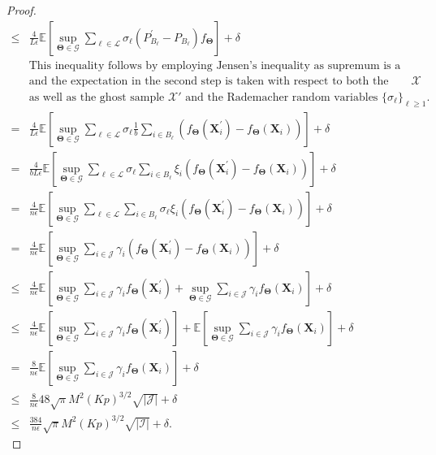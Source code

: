 \documentclass[11pt]{article}
\newcommand{\bX}{\boldsymbol{X}}
\newcommand{\bTheta}{\boldsymbol{\Theta}}
\newcommand{\I}{\mathcal{I}}
\newcommand{\E}{\mathbb{E}}
\newcommand{\J}{\mathcal{J}}
\newcommand{\cL}{\mathcal{L}}
\begin{document}
\begin{proof}
\begin{align}
     \le & \frac{4}{L \epsilon}\E\left[\sup_{\bTheta \in \mathscr{G}}\sum_{\ell \in \cL}\sigma_\ell  (P^\prime_{B_\ell}-P_{B_\ell})f_{\bTheta} \right]+ \delta \nonumber \\
     & \text{This inequality follows by employing Jensen's inequality as supremum is a convex function,}\nonumber\\ & \text{and the expectation in the second step is taken with respect to both the original sample $\mathcal{X}$}\nonumber\\ & \text{as well as the ghost sample $\mathcal{X}'$ and the Rademacher random variables $\{\sigma_{\ell}\}_{\ell\ge 1}$.}\nonumber\\
     = & \frac{4}{L \epsilon}\E\left[\sup_{\bTheta \in \mathscr{G}}\sum_{\ell \in \cL}\sigma_\ell  \frac{1}{b}\sum_{i \in B_\ell}(f_{\bTheta}(\bX_i^\prime)-f_{\bTheta}(\bX_i)) \right]+ \delta \nonumber \\
     = & \frac{4}{b L \epsilon}\E\left[\sup_{\bTheta \in \mathscr{G}}\sum_{\ell \in \cL}\sigma_\ell  \sum_{i \in B_\ell} \xi_i(f_{\bTheta}(\bX_i^\prime)-f_{\bTheta}(\bX_i)) \right]+ \delta \label{eq8} \\
     = & \frac{4}{n \epsilon}\E\left[\sup_{\bTheta \in \mathscr{G}}\sum_{\ell \in \cL}  \sum_{i \in B_\ell} \sigma_\ell \xi_i(f_{\bTheta}(\bX_i^\prime)-f_{\bTheta}(\bX_i)) \right]+ \delta \nonumber \\
     = & \frac{4}{n \epsilon}\E\left[\sup_{\bTheta \in \mathscr{G}} \sum_{i \in \J} \gamma_i (f_{\bTheta}(\bX_i^\prime)-f_{\bTheta}(\bX_i)) \right]+ \delta \label{eq9} \\
     \le &  \frac{4}{n \epsilon}\E\left[\sup_{\bTheta \in \mathscr{G}} \sum_{i \in \J} \gamma_i f_{\bTheta}(\bX_i^\prime)+ \sup_{\bTheta \in \mathscr{G}} \sum_{i \in \J} \gamma_i f_{\bTheta}(\bX_i) \right]+ \delta\\
     \le & \frac{4}{n \epsilon}\E\left[\sup_{\bTheta \in \mathscr{G}} \sum_{i \in \J} \gamma_i f_{\bTheta}(\bX_i^\prime)\right]+\E\left[ \sup_{\bTheta \in \mathscr{G}} \sum_{i \in \J} \gamma_i f_{\bTheta}(\bX_i) \right]+ \delta\\
     = & \frac{8}{n \epsilon}\E\left[\sup_{\bTheta \in \mathscr{G}} \sum_{i \in \J} \gamma_i f_{\bTheta}(\bX_i) \right]+ \delta \nonumber \\
     \le & \frac{8}{n \epsilon} 48 \sqrt{\pi}  M^2  (Kp)^{3/2}  \sqrt{|\J|} + \delta \label{eq10} \\
     \le & \frac{384}{n \epsilon}  \sqrt{\pi}  M^2  (Kp)^{3/2} \sqrt{|\I|} + \delta. \label{eq11}
\end{align}
\endgroup


\end{proof}
\end{document}
